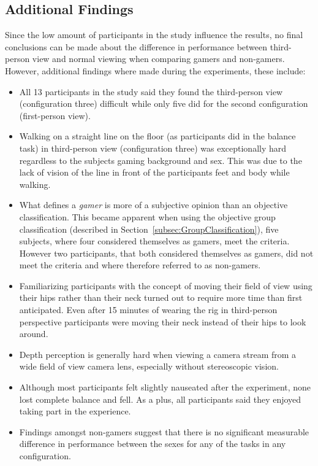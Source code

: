 \documentclass[runningheads,a4paper,oribibl]{llncs}
\begin{document}
\subsection{Additional Findings} \label{subsec:AdditionalFindings}
Since the low amount of participants in the study influence the results, no final conclusions can be made about the difference in performance between third-person view and normal viewing when comparing gamers and non-gamers. However, additional findings where made during the experiments, these include:
\begin{itemize}
	\item All 13 participants in the study said they found the third-person view (configuration three) difficult while only five did for the second configuration (first-person view).

	\item Walking on a straight line on the floor (as participants did in the balance task) in third-person view (configuration three) was exceptionally hard regardless to the subjects gaming background and sex. This was due to the lack of vision of the line in front of the participants feet and body while walking. 

	\item What defines a \emph{gamer} is more of a subjective opinion than an objective classification. This became apparent when using the objective group classification (described in Section~\ref{subsec:GroupClassification}), five subjects, where four considered themselves as gamers, meet the criteria. However two participants, that both considered themselves as gamers, did not meet the criteria and where therefore referred to as non-gamers.

	\item Familiarizing participants with the concept of moving their field of view using their hips rather than their neck turned out to require more time than first anticipated. Even after 15 minutes of wearing the rig in third-person perspective participants were moving their neck instead of their hips to look around.

	\item Depth perception is generally hard when viewing a camera stream from a wide field of view camera lens, especially without stereoscopic vision.

	\item Although most participants felt slightly nauseated after the experiment, none lost complete balance and fell. As a plus, all participants said they enjoyed taking part in the experience.

   \item Findings amongst non-gamers suggest that there is no significant measurable difference in performance between the sexes for any of the tasks in any configuration.
\end{itemize}
\end{document}
